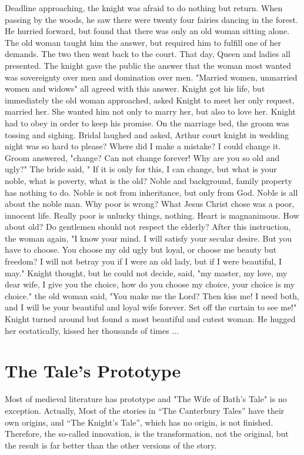 Deadline approaching, the knight was afraid to do nothing but return. When passing by the woods, he saw there were twenty four fairies dancing in the forest. He hurried forward, but found that there was only an old woman sitting alone. The old woman taught him the answer, but required him to fulfill one of her demands. The two then went back to the court. That day, Queen and ladies all presented. The knight gave the public the answer that the woman most wanted was sovereignty over men and domination over men. "Married women, unmarried women and widows" all agreed with this answer. Knight got his life, but immediately the old woman approached, asked Knight to meet her only request, married her. She wanted him not only to marry her, but also to love her. Knight had to obey in order to keep his promise. On the marriage bed, the groom was tossing and sighing. Bridal laughed and asked, Arthur court knight in wedding night was so hard to please? Where did I make a mistake? I could change it. Groom answered, "change? Can not change forever! Why are you so old and ugly?" The bride said, " If it is only for this, I can change, but what is your noble, what is poverty, what is the old? Noble and background, family property has nothing to do. Noble is not from inheritance, but only from God. Noble is all about the noble man. Why poor is wrong? What Jesus Christ chose was a poor, innocent life. Really poor is unlucky things, nothing. Heart is magnanimous. How about old? Do gentlemen should not respect the elderly? After this instruction, the woman again, "I know your mind. I will satisfy your secular desire. But you have to choose. You choose my old ugly but loyal, or choose me beauty but freedom? I will not betray you if I were an old lady, but if I were beautiful, I may." Knight thought, but he could not decide, said, "my master, my love, my dear wife, I give you the choice, how do you choose my choice, your choice is my choice." the old woman said, "You make me the Lord? Then kiss me! I need both, and I will be your beautiful and loyal wife forever. Set off the curtain to see me!" Knight turned around but found a most beautiful and cutest woman. He hugged her ecstatically, kissed her thousands of times ...\cite{aguirre1993riddle}


\section{The Tale's Prototype}
\label{prototype}
Most of medieval literature has prototype and "The Wife of Bath's Tale" is no exception. Actually, Most of the stories in “The Canterbury Tales” have their own origins, and “The Knight's Tale”, which has no origin, is not finished. Therefore, the so-called innovation, is the transformation, not the original, but the result is far better than the other versions of the story.

